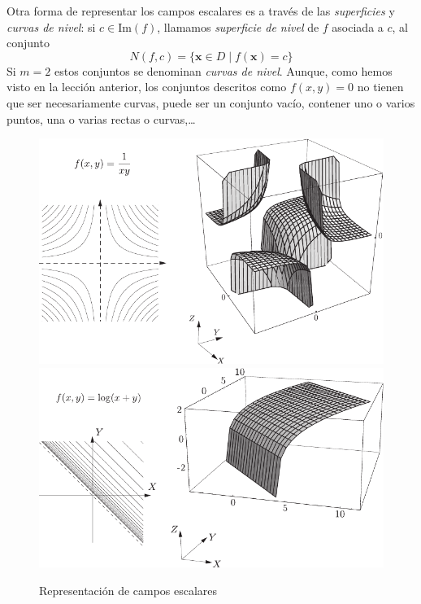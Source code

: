 Otra forma de representar los campos escalares es a través de las \emph{superficies} y \emph{curvas de nivel}:
si $c\in\mathrm{Im}(f)$, llamamos \emph{superficie de nivel} de $f$ asociada a $c$, al conjunto
\[
N(f,c)=\{ \boldsymbol{x}\in \mathit{D}\mid f(\boldsymbol{x})=c\}
\]
Si $m=2$ estos conjuntos se denominan \emph{curvas de nivel}.
Aunque, como hemos visto en la lección anterior, los conjuntos descritos como $f(x,y)=0$ no tienen que ser necesariamente curvas, puede ser un conjunto vacío, contener uno o varios puntos, una o varias rectas o curvas,\dots
%
\begin{figure}
\begin{center}
\includegraphics{T2/figs/nivel1.pdf}\\[5em]
\includegraphics{T2/figs/nivel2.pdf}
\end{center}
\caption{Representación de campos escalares}\label{fig-rep1}
\end{figure}

